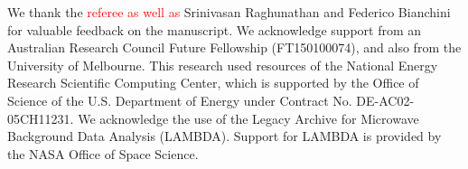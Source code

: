 \documentclass[apj]{emulateapj}
\newcommand{\changed}[1]{\textcolor{Red}{#1}}
\begin{document}
\acknowledgments %

We thank the \changed{referee as well as} Srinivasan Raghunathan and Federico Bianchini for valuable feedback on the manuscript. 
We acknowledge support from an Australian Research Council Future Fellowship (FT150100074), and also from the University of Melbourne. 
This research used resources of the National Energy Research Scientific Computing Center, which is supported by the Office of Science of the U.S. Department of Energy under Contract No. DE-AC02-05CH11231. 
We acknowledge the use of the Legacy Archive for Microwave Background Data Analysis (LAMBDA). Support for LAMBDA is provided by the NASA Office of Space Science.



\end{document}
